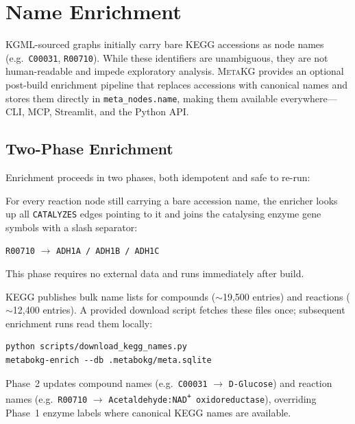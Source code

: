 \documentclass[10pt]{article}
\begin{document}
\section{Name Enrichment}
\label{sec:enrich}

KGML-sourced graphs initially carry bare KEGG accessions as node names
(e.g.\ \texttt{C00031}, \texttt{R00710}). While these identifiers are
unambiguous, they are not human-readable and impede exploratory analysis.
\textsc{MetaKG} provides an optional post-build enrichment pipeline that
replaces accessions with canonical names and stores them directly in
\texttt{meta\_nodes.name}, making them available everywhere---CLI, MCP,
Streamlit, and the Python API.

\subsection{Two-Phase Enrichment}

Enrichment proceeds in two phases, both idempotent and safe to re-run:

\begin{description}[leftmargin=*,itemsep=3pt]
  \item[Phase~1 (no network, always runs).] For every reaction node still
    carrying a bare accession name, the enricher looks up all
    \texttt{CATALYZES} edges pointing to it and joins the catalysing enzyme
    gene symbols with a slash separator:
    \begin{center}
      \texttt{R00710} $\to$ \texttt{ADH1A / ADH1B / ADH1C}
    \end{center}
    This phase requires no external data and runs immediately after build.

  \item[Phase~2 (requires downloaded KEGG name lists).] KEGG publishes bulk
    name lists for compounds ($\sim$19,500 entries) and reactions
    ($\sim$12,400 entries). A provided download script fetches these files
    once; subsequent enrichment runs read them locally:
    \begin{lstlisting}[style=bash]
python scripts/download_kegg_names.py
metabokg-enrich --db .metabokg/meta.sqlite
    \end{lstlisting}
    Phase~2 updates compound names (e.g.\ \texttt{C00031} $\to$
    \texttt{D-Glucose}) and reaction names (e.g.\ \texttt{R00710} $\to$
    \texttt{Acetaldehyde:NAD\textsuperscript{+} oxidoreductase}), overriding
    Phase~1 enzyme labels where canonical KEGG names are available.
\end{description}
\end{document}
